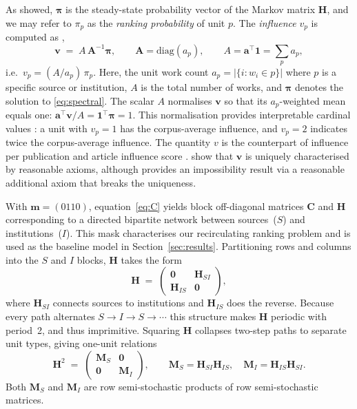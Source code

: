 As \textcite{gellerCitationInfluenceMethodology1978} showed, $\boldsymbol{\pi}$ is the steady-state probability vector of the Markov matrix $\mathbf{H}$, and we may refer to $\pi_p$ as the \emph{ranking probability} of unit $p$.
The \emph{influence} $v_p$ is computed as \citep{palacios-huertaMeasurementIntellectualInfluence2004},
\begin{equation}
	\mathbf{v}
	\;=\;
	A\,\mathbf{A}^{-1}\boldsymbol{\pi},
	\qquad
	\mathbf{A}=\mathrm{diag}(a_p),
	\qquad
	A = \mathbf{a}^{\top}\mathbf{1} = \textstyle\sum_p a_p,
	\label{eq:vstar}
\end{equation}
i.e.\ $v_p = (A/a_p)\,\pi_p$. 
Here, the unit work count $a_p = |\{i:w_i\in p\}|$ where $p$ is a specific source or institution, $A$ is the total number of works, and $\boldsymbol{\pi}$ denotes the solution to \eqref{eq:spectral}.
The scalar $A$ normalises $\mathbf{v}$ so that its $a_p$-weighted mean equals one:
$\mathbf{a}^{\top}\mathbf{v}/A=\mathbf{1}^{\top}\boldsymbol{\pi}=1$.
This normalisation provides interpretable cardinal values \citep{stevensTheoryScalesMeasurement1946}: a unit with $v_p=1$ has the corpus-average influence, and
$v_p=2$ indicates twice the corpus-average influence.  The quantity $v$ is the counterpart of influence per publication \citep{pinskiCitationInfluenceJournal1976} and article influence score 
\citep{bergstromEigenfactorMetrics2008}.
\textcite{palacios-huertaMeasurementIntellectualInfluence2004} show that
$\mathbf{v}$ is uniquely characterised by reasonable axioms, although \textcite{serranoMeasurementIntellectualInfluence2004} provides an impossibility result via a reasonable additional axiom that breaks the uniqueness.

With $\mathbf{m}=(0110)$, equation~\eqref{eq:C} yields block off-diagonal matrices $\mathbf{C}$ and $\mathbf{H}$ corresponding to a directed bipartite network between sources~($S$) and institutions~($I$). This mask characterises our recirculating ranking problem and is used as the baseline model in Section~\ref{sec:results}.
Partitioning rows and columns into the $S$ and $I$ blocks, $\mathbf{H}$ takes the form
\begin{equation}
  \mathbf{H}
  \;=\;
  \begin{pmatrix} \mathbf{0} & \mathbf{H}_{SI} \\ \mathbf{H}_{IS} & \mathbf{0} \end{pmatrix},
  \label{eq:H_bipartite}
\end{equation}
where $\mathbf{H}_{SI}$ connects sources to institutions and $\mathbf{H}_{IS}$ does the reverse.
Because every path alternates $S\to I\to S\to\cdots$ this structure makes $\mathbf{H}$ periodic with period~2, and thus imprimitive.
Squaring $\mathbf{H}$ collapses two-step paths to separate unit types, giving one-unit relations
\[
  \mathbf{H}^2
  \;=\;
  \begin{pmatrix} \mathbf{M}_S & \mathbf{0} \\ \mathbf{0} & \mathbf{M}_I \end{pmatrix},
  \qquad
  \mathbf{M}_S = \mathbf{H}_{SI}\mathbf{H}_{IS},
  \quad
  \mathbf{M}_I = \mathbf{H}_{IS}\mathbf{H}_{SI}.
\]
Both $\mathbf{M}_S$ and $\mathbf{M}_I$ are row semi-stochastic products of row semi-stochastic matrices.

